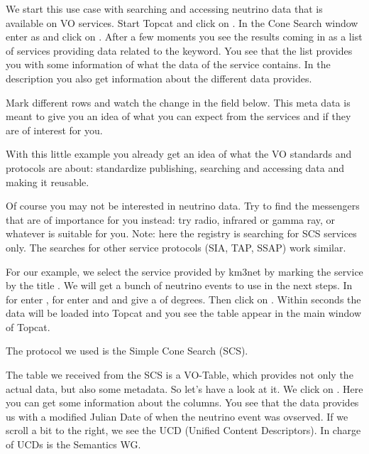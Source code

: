 \documentclass[twoside]{article}[12pt]
\begin{document}

We start this use case with searching and accessing neutrino data
that is available on VO services. Start Topcat and click on
\goto {}. In the Cone Search window enter
 as  and click on .
After a few moments you see the results coming in as a list of services
providing data related to the keyword. You see that the list provides
you with some information of what the data of the service contains. In
the description you also get information about the different data
provides.

\REGISTRY

Mark different rows and watch the  change in the field below. This meta data is meant to give you an idea of what you can expect from the services and if they are of
interest for you.

With this little example you already get an idea of what the VO
standards and protocols are about: standardize publishing, searching and
accessing data and making it reusable. 


\begin{exercise}Of course you may not be interested in neutrino data.
Try to find the messengers that are of importance for you instead: try radio,
infrared or gamma ray, or whatever is suitable for you. Note: here the
registry is searching for SCS services only. The searches for other
service protocols (SIA, TAP, SSAP) work similar. 
\end{exercise}


For our example, we select the service provided by km3net by marking the
service by the title . We will get a bunch of
neutrino events to use in the next steps.  In 
for  enter , for  enter  and and give
a  of  degrees. Then click on . Within
seconds the data will be loaded into Topcat and you see the table appear
in the main window of Topcat.

The protocol we used is the Simple Cone Search (SCS).


\SCS
The table we received from the SCS is a VO-Table, which provides not
only the actual data, but also some metadata. So let's have a look at
it. We click on \goto {}. Here you can get some
information about the columns. You see that the data provides us with a
modified Julian Date of when the neutrino event was ovserved. If we
scroll a bit to the right, we see the UCD (Unified Content Descriptors).
In charge of UCDs is the Semantics WG. 
\end{document}
